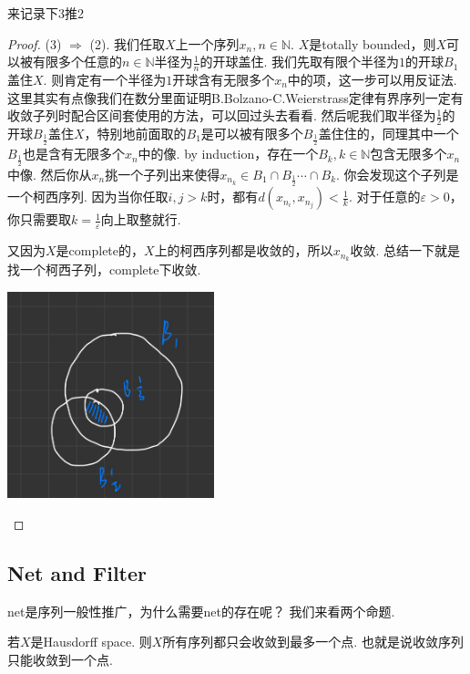 来记录下3推2
\begin{proof}
(3) $\Rightarrow$ (2). 我们任取$X$上一个序列$x_n,n\in \mathbb{N}$. $X$是totally bounded，则$X$可以被有限多个任意的$n \in \mathbb{N}$半径为$\frac{1}{n}$的开球盖住. 我们先取有限个半径为$1$的开球$B_1$盖住$X$. 则肯定有一个半径为$1$开球含有无限多个$x_n$中的项，这一步可以用反证法. 这里其实有点像我们在数分里面证明B.Bolzano-C.Weierstrass定律有界序列一定有收敛子列时配合区间套使用的方法，可以回过头去看看. 然后呢我们取半径为$\frac{1}{2}$的开球$B_\frac{1}{2}$盖住$X$，特别地前面取的$B_1$是可以被有限多个$B_\frac{1}{2}$盖住住的，同理其中一个$B_\frac{1}{2}$也是含有无限多个$x_n$中的像. by induction，存在一个$B_k,k \in \mathbb{N}$包含无限多个$x_n$中像. 然后你从$x_n$挑一个子列出来使得$x_{n_k} \in B_1 \cap B_\frac{1}{2} \cdots \cap B_k$. 你会发现这个子列是一个柯西序列. 因为当你任取$i,j > k$时，都有$d(x_{n_i},x_{n_j}) < \frac{1}{k}$. 对于任意的$\varepsilon > 0$，你只需要取$k = \frac{1}{\varepsilon}$向上取整就行.

又因为$X$是complete的，$X$上的柯西序列都是收敛的，所以$x_{n_k}$收敛.{\color{red} 总结一下就是找一个柯西子列，complete下收敛}.

\begin{center}
\includegraphics[width=6cm, height=6cm]{images/complete_totally_bounded_to_sequentially_compact.jpg}
\end{center}
\end{proof}


\newpage
\subsection{Net and Filter}
net是序列一般性推广，为什么需要net的存在呢？ 我们来看两个命题.

\begin{theorem}
\rm 若$X$是Hausdorff space. 则$X$所有序列都只会收敛到最多一个点. 也就是说收敛序列只能收敛到一个点.
\end{theorem}

